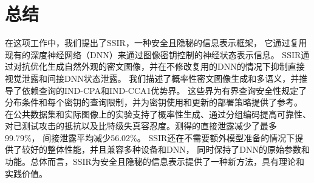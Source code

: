 \chapter{总结}
在这项工作中，我们提出了SSIR，一种安全且隐秘的信息表示框架，
它通过复用现有的深度神经网络（DNN）来通过图像密钥控制的神经状态表示信息。
SSIR通过对抗优化生成自然外观的密文图像，并在不修改复用的DNN的情况下抑制直接视觉泄露和间接DNN状态泄露。
我们描述了概率性密文图像生成和多语义，并推导了依赖查询的IND-CPA和IND-CCA1优势界。
这些界为有界查询安全性规定了分布条件和每个密钥的查询限制，并为密钥使用和更新的部署策略提供了参考。
在公共数据集和实际图像上的实验支持了概率性生成、通过分组编码提高可靠性、
对已测试攻击的抵抗以及比特级失真容忍度。测得的直接泄露减少了最多99.79\%，
间接泄露平均减少56.02\%。
SSIR还在不需要额外模型准备的情况下提供了较好的整体性能，并且兼容多种设备和DNN，
同时保持了DNN的原始参数和功能。总体而言，SSIR为安全且隐秘的信息表示提供了一种新方法，具有理论和实践价值。
